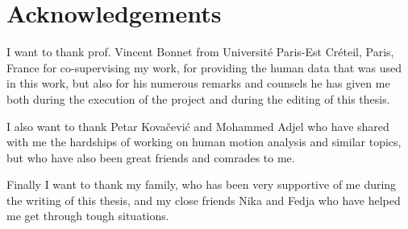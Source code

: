 \documentclass[12pt, a4paper]{article}
\begin{document}
\setcounter{page}{3}
\section*{Acknowledgements}
I want to thank prof. Vincent Bonnet from Université Paris-Est Créteil, Paris, France for co-supervising my work, for providing the human data that was used in this work, but also for his numerous remarks and counsels he has given me both during the execution of the project and during the editing of this thesis.\par

\noindent I also want to thank Petar Kovačević and Mohammed Adjel who have shared with me the hardships of working on human motion analysis and similar topics, but who have also been great friends and comrades to me.\par
\noindent Finally I want to thank my family, who has been very supportive of me during the writing of this thesis, and my close friends Nika and Fedja who have helped me get through tough situations.



\tableofcontents

\end{document}
